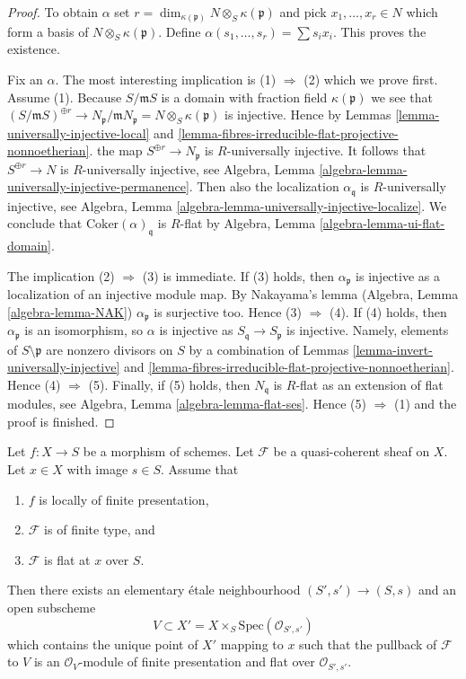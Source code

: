 \begin{proof}
To obtain $\alpha$ set
$r = \dim_{\kappa(\mathfrak p)} N \otimes_S \kappa(\mathfrak p)$ and pick
$x_1, \ldots, x_r \in N$ which form a basis of
$N \otimes_S \kappa(\mathfrak p)$. Define
$\alpha(s_1, \ldots, s_r) = \sum s_i x_i$. This proves the existence.

\medskip\noindent
Fix an $\alpha$. The most interesting implication is
(1) $\Rightarrow$ (2) which we prove first. Assume (1).
Because $S/\mathfrak mS$ is a domain with fraction field $\kappa(\mathfrak p)$
we see that
$(S/\mathfrak mS)^{\oplus r} \to
N_{\mathfrak p}/\mathfrak mN_{\mathfrak p} = N \otimes_S \kappa(\mathfrak p)$
is injective. Hence by
Lemmas \ref{lemma-universally-injective-local} and
\ref{lemma-fibres-irreducible-flat-projective-nonnoetherian}.
the map $S^{\oplus r} \to N_{\mathfrak p}$ is $R$-universally injective.
It follows that $S^{\oplus r} \to N$ is $R$-universally injective, see
Algebra, Lemma \ref{algebra-lemma-universally-injective-permanence}.
Then also the localization $\alpha_{\mathfrak q}$ is $R$-universally
injective, see
Algebra, Lemma \ref{algebra-lemma-universally-injective-localize}.
We conclude that $\text{Coker}(\alpha)_{\mathfrak q}$ is $R$-flat by
Algebra, Lemma \ref{algebra-lemma-ui-flat-domain}.

\medskip\noindent
The implication (2) $\Rightarrow$ (3) is immediate. If (3) holds, then
$\alpha_{\mathfrak p}$ is injective as a localization of an injective
module map. By Nakayama's lemma
(Algebra, Lemma \ref{algebra-lemma-NAK})
$\alpha_{\mathfrak p}$ is surjective too. Hence (3) $\Rightarrow$ (4).
If (4) holds, then $\alpha_{\mathfrak p}$ is an isomorphism, so
$\alpha$ is injective as $S_{\mathfrak q} \to S_{\mathfrak p}$ is injective.
Namely, elements of $S \setminus \mathfrak p$ are nonzero divisors on $S$
by a combination of
Lemmas \ref{lemma-invert-universally-injective} and
\ref{lemma-fibres-irreducible-flat-projective-nonnoetherian}.
Hence (4) $\Rightarrow$ (5). Finally, if (5) holds, then
$N_{\mathfrak q}$ is $R$-flat as an extension of flat modules, see
Algebra, Lemma \ref{algebra-lemma-flat-ses}.
Hence (5) $\Rightarrow$ (1) and the proof is finished.
\end{proof}

\begin{proposition}
\label{proposition-finite-type-flat-at-point}
Let $f : X \to S$ be a morphism of schemes.
Let $\mathcal{F}$ be a quasi-coherent sheaf on $X$.
Let $x \in X$ with image $s \in S$.
Assume that
\begin{enumerate}
\item $f$ is locally of finite presentation,
\item $\mathcal{F}$ is of finite type, and
\item $\mathcal{F}$ is flat at $x$ over $S$.
\end{enumerate}
Then there exists an elementary \'etale neighbourhood $(S', s') \to (S, s)$
and an open subscheme
$$
V \subset X' = X \times_S \text{Spec}(\mathcal{O}_{S', s'})
$$
which contains the unique point of $X'$ mapping to $x$
such that the pullback of $\mathcal{F}$ to $V$ is an $\mathcal{O}_V$-module
of finite presentation and flat over $\mathcal{O}_{S', s'}$.
\end{proposition}

